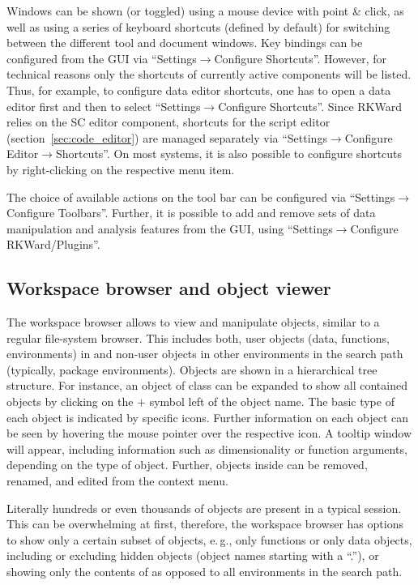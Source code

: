 Windows can be shown (or toggled) using a mouse device with point \&
click, as well as using a series of keyboard shortcuts (defined by
default) for switching between the different tool and document windows.
Key bindings can be configured from the GUI via ``Settings$\rightarrow$Configure Shortcuts''. 
However, for technical reasons only the shortcuts of currently active components 
will be listed. Thus, for example, to
configure data editor shortcuts, one has to open a data editor first and
then to select ``Settings$\rightarrow$Configure Shortcuts''. Since RKWard relies on the 
 SC editor component,
shortcuts for the script editor (section~\ref{sec:code_editor}) are managed separately via 
``Settings$\rightarrow$Configure Editor$\rightarrow$Shortcuts''. On most systems, it is also
possible to configure shortcuts by right-clicking on the respective
menu item.

The choice of available actions on the tool bar can be
configured via ``Settings$\rightarrow$Configure Toolbars''. Further, it is possible to add and remove sets
of data manipulation and analysis features from the GUI, using
``Settings$\rightarrow$Configure RKWard/Plugins''.

\subsection{Workspace browser and object viewer}
\label{sec:workspace_browser_object_viewer}

The workspace browser allows to view
and manipulate  objects, similar
to a regular file-system browser. This includes both, user objects
(data, functions, environments) in  and non-user objects in other environments in the
 search path (typically,
 package environments). Objects are shown
in a hierarchical tree structure. For instance, an object of class
 can be expanded to show all contained objects 
by clicking on the $+$ symbol left of the object name.
The basic type of each object is indicated by specific icons. Further
information on each object can be seen by hovering the mouse
pointer over the respective icon. A tooltip window will appear,
including information such as dimensionality or function arguments,
depending on the type of object. Further, objects inside  can be
removed, renamed, and edited from the context menu.

Literally hundreds or even thousands of objects are present in a typical
 session. This can be overwhelming at
first, therefore, the workspace browser has options to show only a certain
subset of objects, e.\,g., only functions or only data objects, including
or excluding hidden objects (object names starting with a 
``.''), or showing only the contents of  as
opposed to all environments in the search path.

